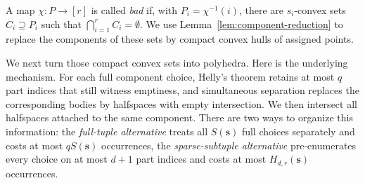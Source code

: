 \documentclass[11pt]{article}
\theoremstyle{definition}
\begin{document}
A map \(\chi:P\to [r]\) is called \emph{bad} if, with \(P_{i}=\chi^{-1}(i)\), there are \(s_{i}\)-convex sets \(C_{i}\supseteq P_{i}\) such that \(\bigcap_{i=1}^{r}C_{i}=\emptyset\). We use Lemma~\ref{lem:component-reduction} to replace the components of these sets by compact convex hulls of assigned points.

We next turn those compact convex sets into polyhedra. Here is the underlying mechanism. For each full component choice, Helly's theorem retains at most \(q\) part indices that still witness emptiness, and simultaneous separation replaces the corresponding bodies by halfspaces with empty intersection. We then intersect all halfspaces attached to the same component. There are two ways to organize this information: the \emph{full-tuple alternative} treats all \(S(\boldsymbol{s})\) full choices separately and costs at most \(qS(\boldsymbol{s})\) occurrences, the \emph{sparse-subtuple alternative} pre-enumerates every choice on at most \(d+1\) part indices and costs at most \(H_{d,r}(\boldsymbol{s})\) occurrences.
\end{document}
